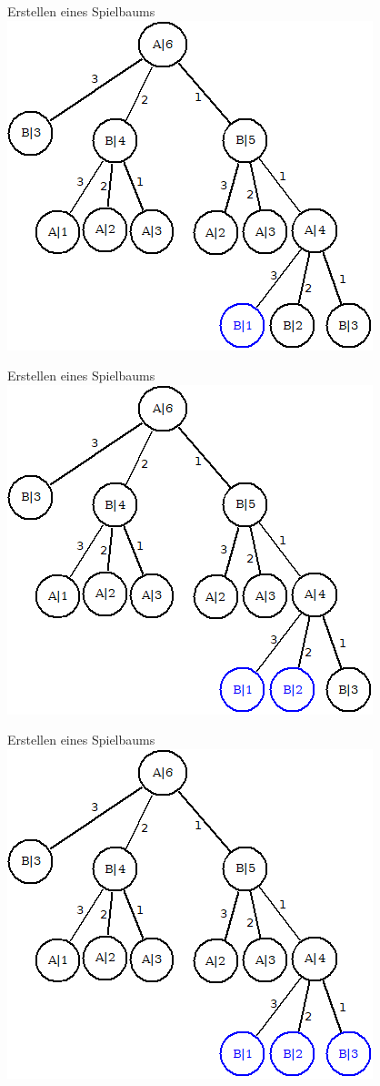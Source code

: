 \documentclass[18pt]{beamer}
\begin{document}
\begin{frame}{Erstellen eines Spielbaums}
\includegraphics[scale=0.4]{baum10.png}
\end{frame}

\begin{frame}{Erstellen eines Spielbaums}
\includegraphics[scale=0.4]{baum11.png}
\end{frame}

\begin{frame}{Erstellen eines Spielbaums}
\includegraphics[scale=0.4]{baum12.png}
\end{frame}
\end{document}
